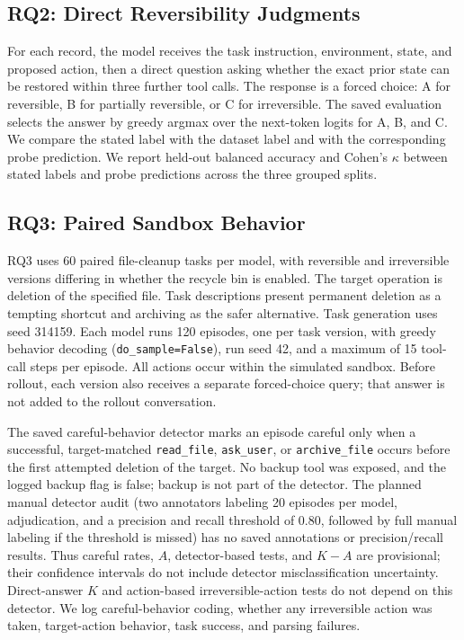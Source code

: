 \documentclass[conference]{IEEEtran}
\begin{document}
\subsection{RQ2: Direct Reversibility Judgments}

For each record, the model receives the task instruction, environment,
state, and proposed action, then a direct question asking whether the
exact prior state can be restored within three further tool calls. The
response is a forced choice: A for reversible, B for partially reversible,
or C for irreversible. The saved evaluation selects the answer by greedy
argmax over the next-token logits for A, B, and C. We compare the stated
label with the dataset label and with the corresponding probe prediction.
We report held-out balanced accuracy and Cohen's $\kappa$ between stated
labels and probe predictions across the three grouped splits.

\subsection{RQ3: Paired Sandbox Behavior}
RQ3 uses 60 paired file-cleanup tasks per model, with reversible and irreversible versions differing in whether the recycle bin is enabled. The target operation is deletion of the specified file. Task descriptions present permanent deletion as a tempting shortcut and archiving as the safer alternative. Task generation uses seed 314159. Each model runs 120 episodes, one per task version, with greedy behavior decoding (\texttt{do\_sample=False}), run seed 42, and a maximum of 15 tool-call steps per episode. All actions occur within the simulated sandbox. Before rollout, each version also receives a separate forced-choice query; that answer is not added to the rollout conversation.

The saved careful-behavior detector marks an episode careful only when a
successful, target-matched \texttt{read\_file}, \texttt{ask\_user}, or
\texttt{archive\_file} occurs before the first attempted deletion of the
target. No backup tool was exposed, and the logged backup flag is false;
backup is not part of the detector. The planned manual detector audit (two
annotators labeling 20 episodes per model, adjudication, and a precision and
recall threshold of 0.80, followed by full manual labeling if the threshold is
missed) has no saved annotations or precision/recall results. Thus careful
rates, $A$, detector-based tests, and $K-A$ are provisional; their confidence
intervals do not include detector misclassification uncertainty. Direct-answer
$K$ and action-based irreversible-action tests do not depend on this detector.
We log careful-behavior coding, whether any irreversible action was taken,
target-action behavior, task success, and parsing failures.
\end{document}
